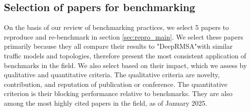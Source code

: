 \subsection{Selection of papers for benchmarking}
\label{sec:paper_summaries}

On the basis of our review of benchmarking practices, we select 5 papers to reproduce and re-benchmark in section \ref{sec:repro_main}. We select these papers primarily because they all compare their results to "DeepRMSA"\footnotemark with similar traffic models and topologies, therefore present the most consistent application of benchmarks in the field. We also select based on their impact, which we assess by qualitative and quantitative criteria. The qualitative criteria are novelty, contribution, and reputation of publication or conference. The quantitative criterion is their blocking performance relative to benchmarks. They are also among the most highly cited papers in the field, as of January 2025.



